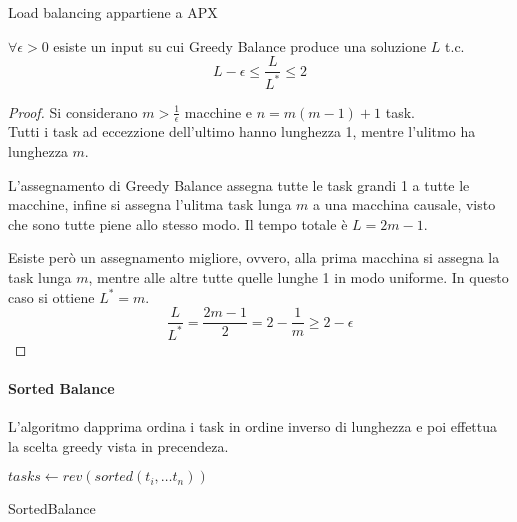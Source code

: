 \begin{corollary}
    Load balancing appartiene a APX    
\end{corollary}
\begin{theorem}
    $\forall \epsilon > 0$ esiste un input su cui Greedy Balance produce una soluzione 
    $L$ t.c. $$L-\epsilon \leq \frac{L}{L^*}\leq2$$
\end{theorem}
\begin{proof}
    Si considerano $m > \frac{1}{\epsilon}$ macchine e $n = m(m-1) + 1$ task.\\
    Tutti i task ad eccezzione dell'ultimo hanno lunghezza 1, mentre l'ulitmo ha lunghezza $m$.

    L'assegnamento di Greedy Balance assegna tutte le task grandi 1 a tutte le macchine, 
    infine si assegna l'ulitma task lunga $m$ a una macchina causale, visto che sono 
    tutte piene allo stesso modo. Il tempo totale è $L = 2m-1$.

    Esiste però un assegnamento migliore, ovvero, alla prima macchina si assegna la task lunga $m$, 
    mentre alle altre tutte quelle lunghe 1 in modo uniforme. In questo caso si ottiene
    $L^* = m$.
    $$\frac{L}{L^*} = \frac{2m-1}{2} = 2 - \frac{1}{m} \geq 2-\epsilon$$
\end{proof}

\paragraph{Sorted Balance}
L'algoritmo dapprima ordina i task in ordine inverso di lunghezza e poi effettua la scelta 
greedy vista in precendeza.

\begin{algorithm}[H]
    \SetAlgoLined
    $tasks \gets rev(sorted(t_i, \dots t_n))$\\
     \caption{SortedBalance}
\end{algorithm}

